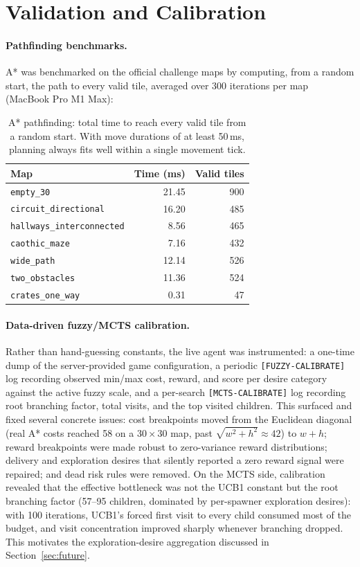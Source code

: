 \section{Validation and Calibration}
\label{sec:validation}

\paragraph{Pathfinding benchmarks.} A* was benchmarked on the official challenge maps by
computing, from a random start, the path to every valid tile, averaged over 300 iterations per
map (MacBook Pro M1 Max):

\begin{table}[htbp]
\centering
\footnotesize
\begin{tabular}{lrr}
\toprule
Map & Time (ms) & Valid tiles \\
\midrule
\texttt{empty\_30} & 21.45 & 900 \\
\texttt{circuit\_directional} & 16.20 & 485 \\
\texttt{hallways\_interconnected} & 8.56 & 465 \\
\texttt{caothic\_maze} & 7.16 & 432 \\
\texttt{wide\_path} & 12.14 & 526 \\
\texttt{two\_obstacles} & 11.36 & 524 \\
\texttt{crates\_one\_way} & 0.31 & 47 \\
\bottomrule
\end{tabular}
\caption{A* pathfinding: total time to reach every valid tile from a random start. With move
durations of at least 50\,ms, planning always fits well within a single movement tick.}
\label{tab:astar}
\end{table}

\paragraph{Data-driven fuzzy/MCTS calibration.} Rather than hand-guessing constants, the live
agent was instrumented: a one-time dump of the server-provided game configuration, a periodic
\texttt{[FUZZY-CALIBRATE]} log recording observed min/max cost, reward, and score per desire
category against the active fuzzy scale, and a per-search \texttt{[MCTS-CALIBRATE]} log
recording root branching factor, total visits, and the top visited children. This surfaced and
fixed several concrete issues: cost breakpoints moved from the Euclidean diagonal (real A* costs
reached 58 on a $30{\times}30$ map, past $\sqrt{w^2+h^2}\approx 42$) to $w+h$; reward
breakpoints were made robust to zero-variance reward distributions; delivery and exploration
desires that silently reported a zero reward signal were repaired; and dead risk rules were
removed. On the MCTS side, calibration revealed that the effective bottleneck was not the UCB1
constant but the root branching factor (57--95 children, dominated by per-spawner exploration
desires): with 100 iterations, UCB1's forced first visit to every child consumed most of the
budget, and visit concentration improved sharply whenever branching dropped. This motivates the
exploration-desire aggregation discussed in Section~\ref{sec:future}.

